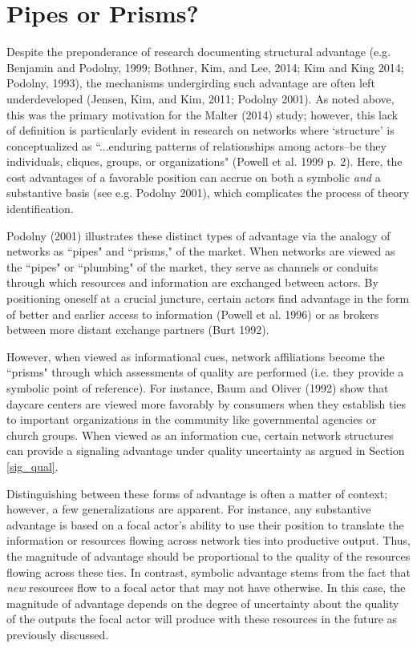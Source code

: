 \section{Pipes or Prisms?}

Despite the preponderance of research documenting structural advantage (e.g. Benjamin and Podolny, 1999; Bothner, Kim, and Lee, 2014; Kim and King 2014; Podolny, 1993), the mechanisms undergirding such advantage are often left underdeveloped (Jensen, Kim, and Kim, 2011; Podolny 2001). As noted above, this was the primary motivation for the Malter (2014) study; however, this lack of definition is particularly evident in research on networks where `structure' is conceptualized as ``...enduring patterns of relationships among actors--be they individuals, cliques, groups, or organizations" (Powell et al. 1999 p. 2). Here, the cost advantages of a favorable position can accrue on both a symbolic \emph{and} a substantive basis (see e.g. Podolny 2001), which complicates the process of theory identification.

Podolny (2001) illustrates these distinct types of advantage via the analogy of networks as ``pipes" and ``prisms," of the market. When networks are viewed as the ``pipes" or ``plumbing" of the market, they serve as channels or conduits through which resources and information are exchanged between actors. By positioning oneself at a crucial juncture, certain actors find advantage in the form of better and earlier access to information (Powell et al. 1996) or as brokers between more distant exchange partners (Burt 1992).

However, when viewed as informational cues, network affiliations become the ``prisms" through which assessments of quality are performed (i.e. they provide a symbolic point of reference). For instance, Baum and Oliver (1992) show that daycare centers are viewed more favorably by consumers when they establish ties to important organizations in the community like governmental agencies or church groups. When viewed as an information cue, certain network structures can provide a signaling advantage under quality uncertainty as argued in Section \ref{sig_qual}.

Distinguishing between these forms of advantage is often a matter of context; however, a few generalizations are apparent. For instance, any substantive advantage is based on a focal actor's ability to use their position to translate the information or resources flowing across network ties into productive output. Thus, the magnitude of advantage should be proportional to the quality of the resources flowing across these ties. In contrast, symbolic advantage stems from the fact that \emph{new} resources flow to a focal actor that may not have otherwise. In this case, the magnitude of advantage depends on the degree of uncertainty about the quality of the outputs the focal actor will produce with these resources in the future as previously discussed.

